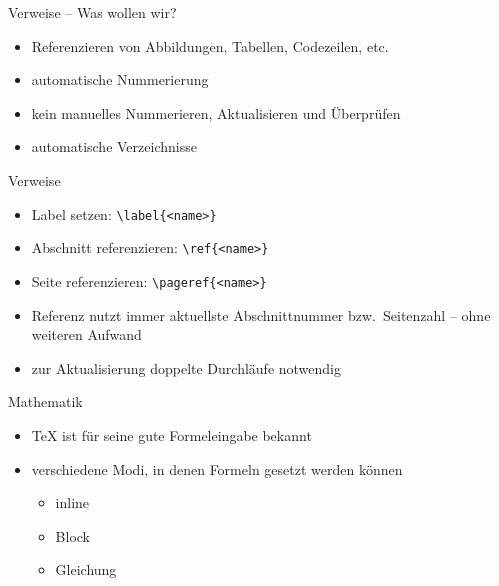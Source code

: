 \documentclass[presentation,aspectratio=169]{beamer}
\begin{document}
\begin{frame}{Verweise -- Was wollen wir?}
  \begin{itemize}
    \item Referenzieren von Abbildungen, Tabellen, Codezeilen, etc.
    \item automatische Nummerierung
    \item kein manuelles Nummerieren, Aktualisieren und Überprüfen
    \item automatische Verzeichnisse
  \end{itemize}
\end{frame}

\begin{frame}[fragile]{Verweise}
  \begin{itemize}
    \item Label setzen: \verb|\label{<name>}|
    \item Abschnitt referenzieren: \verb|\ref{<name>}|
    \item Seite referenzieren: \verb|\pageref{<name>}|
    \item Referenz nutzt immer aktuellste Abschnittnummer bzw.~Seitenzahl -- ohne weiteren Aufwand
    \item zur Aktualisierung doppelte Durchläufe notwendig
  \end{itemize}
\end{frame}

\begin{frame}{Mathematik}
  \begin{itemize}
    \item \TeX{} ist für seine gute Formeleingabe bekannt
    \item verschiedene Modi, in denen Formeln gesetzt werden können
      \begin{itemize}
        \item inline
        \item Block
        \item Gleichung
      \end{itemize}
  \end{itemize}
\end{frame}
\end{document}
